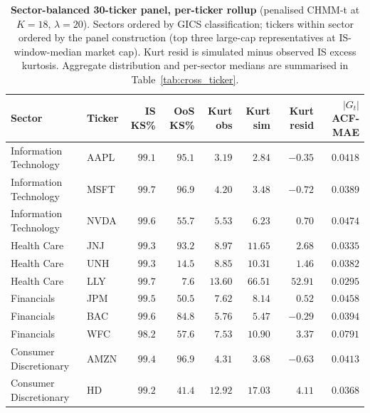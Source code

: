 \begin{table}[!ht]
\centering
\scriptsize
\caption{\textbf{Sector-balanced 30-ticker panel, per-ticker rollup} (penalised CHMM-t at $K = 18$, $\lambda = 20$). Sectors ordered by GICS classification; tickers within sector ordered by the panel construction (top three large-cap representatives at IS-window-median market cap). Kurt resid is simulated minus observed IS excess kurtosis. Aggregate distribution and per-sector medians are summarised in Table~\ref{tab:cross_ticker}.}
\label{tab:sector_panel}
\begin{tabular}{l l r r r r r r}
\toprule
Sector & Ticker & IS KS\% & OoS KS\% & Kurt obs & Kurt sim & Kurt resid & $|G_t|$ ACF-MAE \\
\midrule
Information Technology  & AAPL & $99.1$ & $95.1$ & $\phantom{0}3.19$  & $\phantom{0}2.84$  & $-0.35$  & $0.0418$ \\
Information Technology  & MSFT & $99.7$ & $96.9$ & $\phantom{0}4.20$  & $\phantom{0}3.48$  & $-0.72$  & $0.0389$ \\
Information Technology  & NVDA & $99.6$ & $55.7$ & $\phantom{0}5.53$  & $\phantom{0}6.23$  & $\phantom{-}0.70$  & $0.0474$ \\
\midrule
Health Care             & JNJ  & $99.3$ & $93.2$ & $\phantom{0}8.97$  & $11.65$            & $\phantom{-}2.68$  & $0.0335$ \\
Health Care             & UNH  & $99.3$ & $14.5$ & $\phantom{0}8.85$  & $10.31$            & $\phantom{-}1.46$  & $0.0382$ \\
Health Care             & LLY  & $99.7$ & $\phantom{0}7.6$ & $13.60$            & $66.51$            & $52.91$            & $0.0295$ \\
\midrule
Financials              & JPM  & $99.5$ & $50.5$ & $\phantom{0}7.62$  & $\phantom{0}8.14$  & $\phantom{-}0.52$  & $0.0458$ \\
Financials              & BAC  & $99.6$ & $84.8$ & $\phantom{0}5.76$  & $\phantom{0}5.47$  & $-0.29$            & $0.0394$ \\
Financials              & WFC  & $98.2$ & $57.6$ & $\phantom{0}7.53$  & $10.90$            & $\phantom{-}3.37$  & $0.0791$ \\
\midrule
Consumer Discretionary  & AMZN & $99.4$ & $96.9$ & $\phantom{0}4.31$  & $\phantom{0}3.68$  & $-0.63$            & $0.0413$ \\
Consumer Discretionary  & HD   & $99.2$ & $41.4$ & $12.92$            & $17.03$            & $\phantom{-}4.11$  & $0.0368$ \\

\end{tabular}
\end{table}
